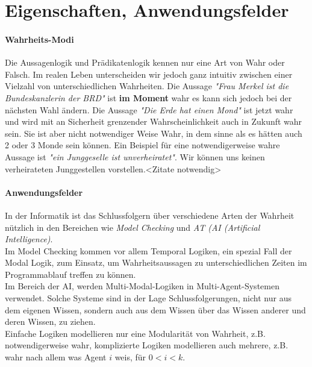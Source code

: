 
\section{Eigenschaften, Anwendungsfelder} %
\label{sec:eigenschaften_anwendungsfelder}

\paragraph{Wahrheits-Modi} %
\label{par:wahrheits_modi}

Die Aussagenlogik und Prädikatenlogik kennen nur eine Art von Wahr oder Falsch. Im realen Leben unterscheiden wir jedoch ganz intuitiv zwischen einer Vielzahl von unterschiedlichen Wahrheiten.
Die Aussage \emph{"Frau Merkel ist die Bundeskanzlerin der BRD"} ist \textbf{im Moment} wahr es kann sich jedoch bei der nächsten Wahl ändern.
Die Aussage \emph{"Die Erde hat einen Mond"} ist jetzt wahr und wird mit an Sicherheit grenzender Wahrscheinlichkeit auch in Zukunft wahr sein. Sie ist aber nicht notwendiger Weise Wahr, in dem sinne als es hätten auch 2 oder 3 Monde sein können.
Ein Beispiel für eine notwendigerweise wahre Aussage ist \emph{"ein Junggeselle ist unverheiratet"}. Wir können uns keinen verheirateten Junggestellen vorstellen.<Zitate notwendig>


\paragraph{Anwendungsfelder} %
\label{par:anwendungsfelder}

In der Informatik ist das Schlussfolgern über verschiedene Arten der Wahrheit nützlich in den Bereichen wie \emph{Model Checking} und \emph{AT (AI (Artificial Intelligence)}. \\
Im Model Checking kommen vor allem Temporal Logiken, ein spezial Fall der Modal Logik, zum Einsatz, um Wahrheitsaussagen zu unterschiedlichen Zeiten im Programmablauf treffen zu können. \\
Im Bereich der AI, werden Multi-Modal-Logiken in Multi-Agent-Systemen verwendet. Solche Systeme sind in der Lage Schlussfolgerungen, nicht nur aus dem eigenen Wissen, sondern auch aus dem Wissen über das Wissen anderer und deren Wissen, zu ziehen.\\
Einfache Logiken modellieren nur eine Modularität von Wahrheit, z.B. notwendigerweise wahr, komplizierte Logiken modellieren auch mehrere, z.B. wahr nach allem was Agent $i$ weis, für $ 0 < i < k$. \cite[S.306f]{huth2004logic}\\

